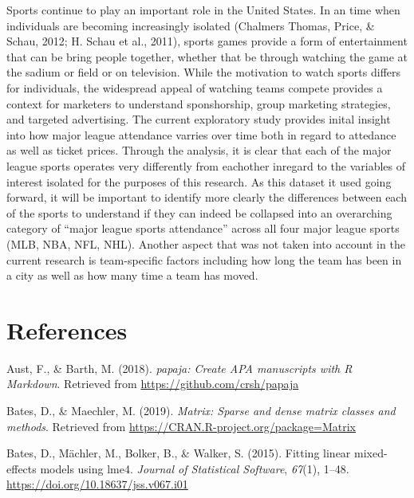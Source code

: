 \documentclass[man, fleqn, noextraspace,floatsintext]{apa6}
\begin{document}
Sports continue to play an important role in the United States. In an
time when individuals are becoming increasingly isolated (Chalmers
Thomas, Price, \& Schau, 2012; H. Schau et al., 2011), sports games
provide a form of entertainment that can be bring people together,
whether that be through watching the game at the sadium or field or on
television. While the motivation to watch sports differs for
individuals, the widespread appeal of watching teams compete provides a
context for marketers to understand sponshorship, group marketing
strategies, and targeted advertising. The current exploratory study
provides inital insight into how major league attendance varries over
time both in regard to attedance as well as ticket prices. Through the
analysis, it is clear that each of the major league sports operates very
differently from eachother inregard to the variables of interest
isolated for the purposes of this research. As this dataset it used
going forward, it will be important to identify more clearly the
differences between each of the sports to understand if they can indeed
be collapsed into an overarching category of \enquote{major league
sports attendance} across all four major league sports (MLB, NBA, NFL,
NHL). Another aspect that was not taken into account in the current
research is team-specific factors including how long the team has been
in a city as well as how many time a team has moved.

\newpage

\section{References}\label{references}

\begingroup
\setlength{\parindent}{-0.5in} \setlength{\leftskip}{0.5in}

\hypertarget{refs}{}
\hypertarget{ref-R-papaja}{}
Aust, F., \& Barth, M. (2018). \emph{papaja: Create APA manuscripts with
R Markdown}. Retrieved from \url{https://github.com/crsh/papaja}

\hypertarget{ref-R-Matrix}{}
Bates, D., \& Maechler, M. (2019). \emph{Matrix: Sparse and dense matrix
classes and methods}. Retrieved from
\url{https://CRAN.R-project.org/package=Matrix}

\hypertarget{ref-R-lme4}{}
Bates, D., Mächler, M., Bolker, B., \& Walker, S. (2015). Fitting linear
mixed-effects models using lme4. \emph{Journal of Statistical Software},
\emph{67}(1), 1--48. \url{https://doi.org/10.18637/jss.v067.i01}
\end{document}
